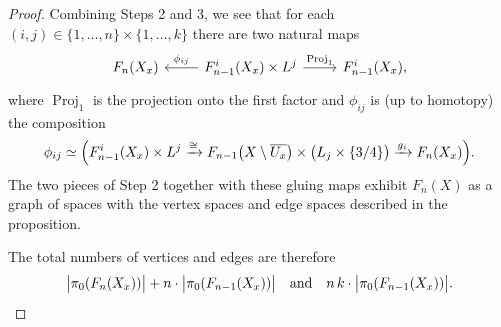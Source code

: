 \documentclass[10pt,a4paper]{amsart}
\DeclareMathOperator{\proj}{Proj}
\begin{document}
\begin{proof}
Combining Steps 2 and 3, we see that for each
\((i,j)\in\{1,\dots,n\}\times\{1,\dots,k\}\) there are two natural
maps
\[
\begin{tikzcd}
F_n(X_x) &
F_{n-1}^i(X_x)\times L^j
  \arrow[l, "\phi_{ij}"']
  \arrow[r, "\proj_1"]
& F_{n-1}^i(X_x),
\end{tikzcd}
\]
where \(\proj_1\) is the projection onto the first
factor and \(\phi_{ij}\) is (up to homotopy) the composition
\[
\phi_{ij} \simeq
\Bigl(
F_{n-1}^i(X_x)\times L^j
\xrightarrow{\cong}
F_{n-1}\bigl(X\setminus \overline{U_x}\bigr)\times \bigl(L_j\times\{3/4\}\bigr)
\xrightarrow{g_i}
F_n(X_x)
\Bigr).
\]
The two pieces of Step 2 together with these gluing maps exhibit
\(F_n(X)\) as a graph of spaces with the vertex spaces and edge
spaces described in the proposition.


The total numbers of vertices and edges are therefore
\[
\bigl|\pi_0(F_n(X_x))\bigr|+n\cdot \bigl|\pi_0(F_{n-1}(X_x))\bigr|\quad\text{and}\quad
n\,k \cdot \bigl|\pi_0(F_{n-1}(X_x))\bigr|.\qedhere
\]
\end{proof}
\end{document}

